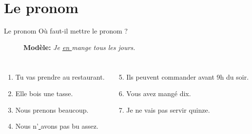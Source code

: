 \documentclass{beamer}
\begin{document}
  \section{Le pronom }
    \begin{frame}{Le pronom }
      Où faut-il mettre le pronom ?
      \begin{description}
        \item[] \textbf{Modèle:} \emph{Je \underline{ en } mange \underline{\hspace{0.5cm}} tous les jours.}
      \end{description}
      \begin{columns}[t]
        \scriptsize
          \begin{enumerate}
            \item Tu \underline{\hspace{0.35cm}} vas \underline{  } prendre \underline{\hspace{0.35cm}} au restaurant.
            \item Elle \underline{  } bois \underline{\hspace{0.35cm}} une tasse.
            \item Nous \underline{  } prenons \underline{\hspace{0.35cm}} beaucoup.
            \item Nous \underline{\hspace{0.35cm}} n'\underline{  } avons \underline{\hspace{0.35cm}} pas \underline{\hspace{0.35cm}} bu \underline{\hspace{0.35cm}} assez.
          \end{enumerate}
          \begin{enumerate}
            \setcounter{enumi}{4}
            \item Ils \underline{\hspace{0.35cm}} peuvent \underline{  } commander \underline{\hspace{0.35cm}} avant 9h du soir.
            \item Vous \underline{  } avez \underline{\hspace{0.35cm}} mangé \underline{\hspace{0.35cm}} dix.
            \item Je \underline{\hspace{0.35cm}} ne \underline{\hspace{0.35cm}} vais \underline{\hspace{0.35cm}} pas \underline{  } servir \underline{\hspace{0.35cm}} quinze.

\end{enumerate}
\end{columns}
\end{frame}
\end{document}
